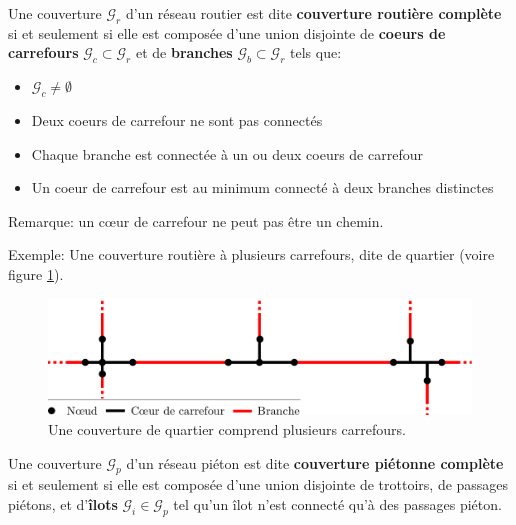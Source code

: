 \begin{definition}
    Une couverture $\mathcal{G}_r$ d'un réseau routier est dite \textbf{couverture routière complète} si et seulement si elle est composée d'une union disjointe de \textbf{coeurs de carrefours} $\mathcal{G}_c \subset \mathcal{G}_r$ et de \textbf{branches} $\mathcal{G}_b \subset \mathcal{G}_r$ tels que:

    \begin{itemize}
        \item $\mathcal{G}_c \neq \emptyset$ 
        \item Deux coeurs de carrefour ne sont pas connectés
        \item Chaque branche est connectée à un ou deux coeurs de carrefour
        \item Un coeur de carrefour est au minimum connecté à deux branches distinctes
    \end{itemize}
    \label{def:modelisation_couverture_routiere_complète}
\end{definition}

\noindent
Remarque: un cœur de carrefour ne peut pas être un chemin.

\noindent
Exemple: Une couverture routière à plusieurs carrefours, dite de quartier (voire figure \ref{fig:mod_ex_couverture_quartier}).

\begin{figure}[ht]
    \centering
    \includegraphics[width=\textwidth]{images/modelisation/graphe/couverture_quartier.pdf}
    \caption[Couverture d'un quartier]{Une couverture de quartier comprend plusieurs carrefours.}
    \label{fig:mod_ex_couverture_quartier}
\end{figure}

\begin{definition}
    Une couverture $\mathcal{G}_p$ d'un réseau piéton est dite \textbf{couverture piétonne complète} si et seulement si elle est composée d'une union disjointe de trottoirs, de passages piétons, et d'\textbf{îlots} $\mathcal{G}_i \in \mathcal{G}_p$ tel qu'un îlot n'est connecté qu'à des passages piéton.
\end{definition}

